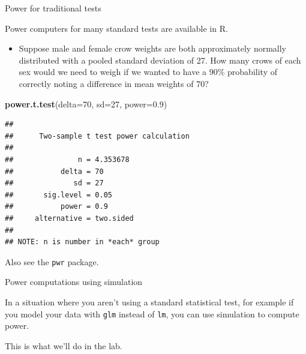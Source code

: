 \documentclass[
  ignorenonframetext,
]{beamer}
\newenvironment{Shaded}{\begin{snugshade}}{\end{snugshade}}
\newcommand{\DataTypeTok}[1]{\textcolor[rgb]{0.13,0.29,0.53}{#1}}
\newcommand{\DecValTok}[1]{\textcolor[rgb]{0.00,0.00,0.81}{#1}}
\newcommand{\FloatTok}[1]{\textcolor[rgb]{0.00,0.00,0.81}{#1}}
\newcommand{\KeywordTok}[1]{\textcolor[rgb]{0.13,0.29,0.53}{\textbf{#1}}}
\newcommand{\NormalTok}[1]{#1}
\providecommand{\tightlist}{%
  \setlength{\itemsep}{0pt}\setlength{\parskip}{0pt}}
\begin{document}
\begin{frame}[fragile]{Power for traditional tests}
\protect\hypertarget{power-for-traditional-tests}{}

Power computers for many standard tests are available in R.

\begin{itemize}
\tightlist
\item
  Suppose male and female crow weights are both approximately normally
  distributed with a pooled standard deviation of 27. How many crows of
  each sex would we need to weigh if we wanted to have a 90\%
  probability of correctly noting a difference in mean weights of 70?
\end{itemize}

\scriptsize

\begin{Shaded}
\begin{Highlighting}[]
\KeywordTok{power.t.test}\NormalTok{(}\DataTypeTok{delta=}\DecValTok{70}\NormalTok{, }\DataTypeTok{sd=}\DecValTok{27}\NormalTok{, }\DataTypeTok{power=}\FloatTok{0.9}\NormalTok{)}
\end{Highlighting}
\end{Shaded}

\begin{verbatim}
## 
##      Two-sample t test power calculation 
## 
##               n = 4.353678
##           delta = 70
##              sd = 27
##       sig.level = 0.05
##           power = 0.9
##     alternative = two.sided
## 
## NOTE: n is number in *each* group
\end{verbatim}

\normalsize

Also see the \texttt{pwr} package.

\end{frame}

\begin{frame}[fragile]{Power computations using simulation}
\protect\hypertarget{power-computations-using-simulation}{}

In a situation where you aren't using a standard statistical test, for
example if you model your data with \texttt{glm} instead of \texttt{lm},
you can use simulation to compute power.

This is what we'll do in the lab.

\end{frame}
\end{document}

